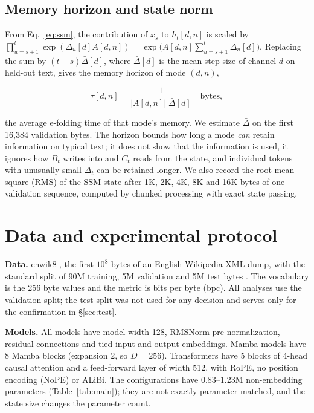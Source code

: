 \documentclass[11pt]{article}
\begin{document}
\subsection{Memory horizon and state norm}\label{sec:horizon}

From Eq.~\eqref{eq:ssm}, the contribution of $x_s$ to $h_t[d,n]$ is scaled by $\prod_{u=s+1}^{t}\exp(\Delta_u[d] A[d,n]) = \exp\!\big(A[d,n]\sum_{u=s+1}^{t}\Delta_u[d]\big)$. Replacing the sum by $(t-s)\bar{\Delta}[d]$, where $\bar{\Delta}[d]$ is the mean step size of channel $d$ on held-out text, gives the memory horizon of mode $(d,n)$,

\begin{equation}\label{eq:horizon}
\tau[d,n] = \frac{1}{|A[d,n]|\;\bar{\Delta}[d]} \quad \text{bytes},
\end{equation}

the average e-folding time of that mode's memory. We estimate $\bar{\Delta}$ on the first 16,384 validation bytes. The horizon bounds how long a mode \emph{can} retain information on typical text; it does not show that the information is used, it ignores how $B_t$ writes into and $C_t$ reads from the state, and individual tokens with unusually small $\Delta_t$ can be retained longer. We also record the root-mean-square (RMS) of the SSM state after 1K, 2K, 4K, 8K and 16K bytes of one validation sequence, computed by chunked processing with exact state passing.

\section{Data and experimental protocol}\label{sec:protocol}

\textbf{Data.} enwik8 \citep{hutter2006prize}, the first $10^8$ bytes of an English Wikipedia XML dump, with the standard split of 90M training, 5M validation and 5M test bytes \citep{alrfou2018char}. The vocabulary is the 256 byte values and the metric is bits per byte (bpc). All analyses use the validation split; the test split was not used for any decision and serves only for the confirmation in \S\ref{sec:test}.

\textbf{Models.} All models have model width 128, RMSNorm pre-normalization, residual connections and tied input and output embeddings. Mamba models have 8 Mamba blocks (expansion 2, so $D = 256$). Transformers have 5 blocks of 4-head causal attention and a feed-forward layer of width 512, with RoPE, no position encoding (NoPE) or ALiBi. The configurations have 0.83--1.23M non-embedding parameters (Table~\ref{tab:main}); they are not exactly parameter-matched, and the state size changes the parameter count.
\end{document}
